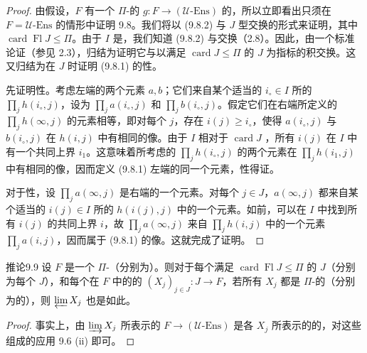 \begin{proof}
由假设，$F$ 有一个 $\Pi$-的 $g:F\to(\mathcal U\text{-}\mathrm{Ens})$ 的，所以立即看出只须在 $F=\mathcal U\text{-}\mathrm{Ens}$ 的情形中证明 9.8。我们将以 (9.8.2) 与 $J$ 型交换的形式来证明，其中 $\operatorname{card}\operatorname{Fl}J\leq\Pi$。由于 $I$ 是，我们知道 (9.8.2) 与交换（2.8）。因此，由一个标准论证（参见 2.3），归结为证明它与以满足 $\operatorname{card}J\leq\Pi$ 的 $J$ 为指标的积交换。这又归结为在 $J$ 时证明 (9.8.1) 的性。

先证明性。考虑左端的两个元素 $a,b$；它们来自某个适当的 $i_\circ\in I$ 所的 $\prod_jh(i_\circ,j)$，设为 $\prod_j a(i_\circ,j)$ 和 $\prod_j b(i_\circ,j)$。假定它们在右端所定义的 $\prod_jh(\infty,j)$ 的元素相等，即对每个 $j$，存在 $i(j)\geq i_\circ$，使得 $a(i_\circ,j)$ 与 $b(i_\circ,j)$ 在 $h(i,j)$ 中有相同的像。由于 $I$ 相对于 $\operatorname{card}J$ ，所有 $i(j)$ 在 $I$ 中有一个共同上界 $i_1$。这意味着所考虑的 $\prod_jh(i_\circ,j)$ 的两个元素在 $\prod_jh(i_1,j)$ 中有相同的像，因而定义 (9.8.1) 左端的同一个元素，性得证。

对于性，设 $\prod_j a(\infty,j)$ 是右端的一个元素。对每个 $j\in J$，$a(\infty,j)$ 都来自某个适当的 $i(j)\in I$ 所的 $h(i(j),j)$ 中的一个元素。如前，可以在 $I$ 中找到所有 $i(j)$ 的共同上界 $i$，故 $\prod_j a(\infty,j)$ 来自 $\prod_jh(i,j)$ 中的一个元素 $\prod_j a(i,j)$，因而属于 (9.8.1) 的像。这就完成了证明。
\end{proof}

\begin{SGAresult}{推论}{9.9}
设 $F$ 是一个 $\Pi$-（分别为）。则对于每个满足 $\operatorname{card}\operatorname{Fl}J\leq\Pi$ 的 $J$（分别为每个 $J$），和每个在 $F$ 中的的 $(X_j)_{j\in J}:J\to F$，若所有 $X_j$ 都是 $\Pi$-的（分别为的），则 $\varprojlim X_j$ 也是如此。
\end{SGAresult}
\begin{proof}
事实上，由 $\varinjlim X_j$ 所表示的 $F\to(\mathcal U\text{-}\mathrm{Ens})$ 是各 $X_j$ 所表示的的，对这些组成的应用 9.6 (ii) 即可。
\end{proof}

